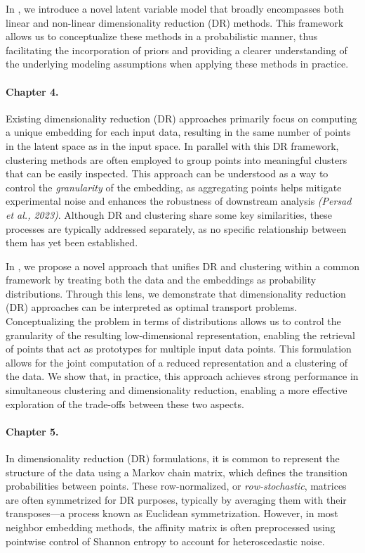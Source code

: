 In , we introduce a novel latent variable model that broadly encompasses both linear and non-linear dimensionality reduction (DR) methods. This framework allows us to conceptualize these methods in a probabilistic manner, thus facilitating the incorporation of priors and providing a clearer understanding of the underlying modeling assumptions when applying these methods in practice.

\paragraph{Chapter 4.}  
Existing dimensionality reduction (DR) approaches primarily focus on computing a unique embedding for each input data, resulting in the same number of points in the latent space as in the input space. In parallel with this DR framework, clustering methods are often employed to group points into meaningful clusters that can be easily inspected. This approach can be understood as a way to control the \emph{granularity} of the embedding, as aggregating points helps mitigate experimental noise and enhances the robustness of downstream analysis \emph{(Persad et al., 2023)}. Although DR and clustering share some key similarities, these processes are typically addressed separately, as no specific relationship between them has yet been established.

In , we propose a novel approach that unifies DR and clustering within a common framework by treating both the data and the embeddings as probability distributions. Through this lens, we demonstrate that dimensionality reduction (DR) approaches can be interpreted as optimal transport problems. Conceptualizing the problem in terms of distributions allows us to control the granularity of the resulting low-dimensional representation, enabling the retrieval of points that act as prototypes for multiple input data points. This formulation allows for the joint computation of a reduced representation and a clustering of the data. We show that, in practice, this approach achieves strong performance in simultaneous clustering and dimensionality reduction, enabling a more effective exploration of the trade-offs between these two aspects.

\paragraph{Chapter 5.}  
In dimensionality reduction (DR) formulations, it is common to represent the structure of the data using a Markov chain matrix, which defines the transition probabilities between points. These row-normalized, or \emph{row-stochastic}, matrices are often symmetrized for DR purposes, typically by averaging them with their transposes—a process known as Euclidean symmetrization. However, in most neighbor embedding methods, the affinity matrix is often preprocessed using pointwise control of Shannon entropy to account for heteroscedastic noise.

